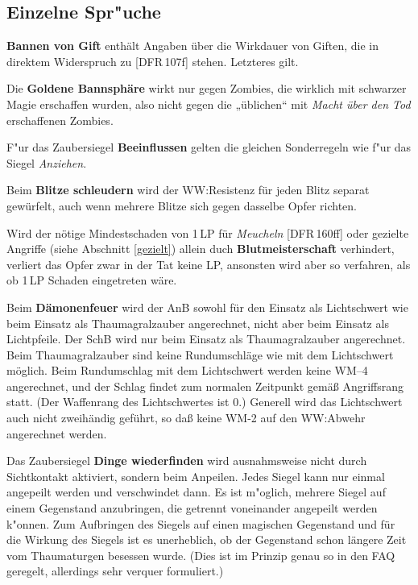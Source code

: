 \documentclass[10pt,a4paper,germanpar]{article}
\begin{document}
\subsection{Einzelne Spr"uche}

\textbf{Bannen von Gift} enthält Angaben über die Wirkdauer von
Giften, die in direktem Widerspruch zu [DFR\,107f] stehen. Letzteres
gilt.

Die \textbf{Goldene Bannsphäre} wirkt nur gegen Zombies, die wirklich
mit schwarzer Magie erschaffen wurden, also nicht gegen die
„üblichen“ mit \emph{Macht über den Tod} erschaffenen Zombies.

F"ur das Zaubersiegel \textbf{Beeinflussen} gelten die gleichen
Sonderregeln wie f"ur das Siegel \emph{Anziehen}.

Beim \textbf{Blitze schleudern} wird der WW:Resistenz für jeden Blitz separat
gewürfelt, auch wenn mehrere Blitze sich gegen dasselbe Opfer richten.

Wird der nötige Mindestschaden von 1\,LP für \emph{Meucheln}
[DFR\,160ff] oder gezielte Angriffe (siehe Abschnitt \ref{gezielt})
allein duch \textbf{Blutmeisterschaft} verhindert, verliert das Opfer
zwar in der Tat keine LP, ansonsten wird aber so verfahren, als ob
1\,LP Schaden eingetreten wäre.

Beim \textbf{Dämonenfeuer} wird der AnB sowohl für den Einsatz als
Lichtschwert wie beim Einsatz als Thaumagralzauber angerechnet, nicht
aber beim Einsatz als Lichtpfeile. Der SchB wird nur beim Einsatz als
Thaumagralzauber angerechnet. Beim Thaumagralzauber sind keine
Rundumschläge wie mit dem Lichtschwert möglich. Beim Rundumschlag mit
dem Lichtschwert werden keine WM--4 angerechnet, und der Schlag findet
zum normalen Zeitpunkt gemäß Angriffsrang statt. (Der Waffenrang des
Lichtschwertes ist 0.) Generell wird das Lichtschwert auch nicht
zweihändig geführt, so daß keine WM-2 auf den WW:Abwehr angerechnet
werden.

Das Zaubersiegel \textbf{Dinge wiederfinden} wird ausnahmsweise nicht
durch Sichtkontakt aktiviert, sondern beim Anpeilen. Jedes Siegel kann 
nur einmal angepeilt werden und verschwindet dann. Es ist m"oglich,
mehrere Siegel auf einem Gegenstand anzubringen, die getrennt
voneinander angepeilt werden k"onnen. Zum Aufbringen des Siegels auf
einen magischen Gegenstand und für die Wirkung des Siegels ist es
unerheblich, ob der Gegenstand schon längere Zeit vom Thaumaturgen
besessen wurde. (Dies ist im Prinzip genau so in den FAQ geregelt,
allerdings sehr verquer formuliert.)
\end{document}

